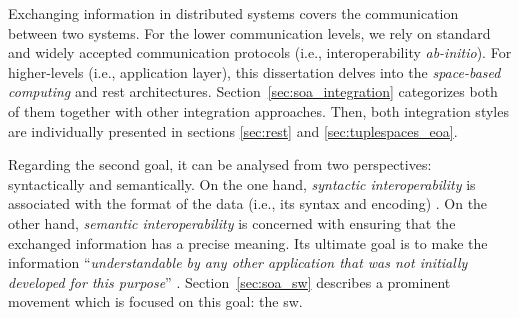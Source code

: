 \medskip

Exchanging information in distributed systems covers the communication between two systems.
For the lower communication levels, we rely on standard and widely accepted communication protocols (i.e., interoperability \emph{ab-initio}). %
For higher-levels (i.e., application layer), this dissertation delves into the \emph{space-based computing} and \ac{rest} architectures.
Section~\ref{sec:soa_integration} categorizes both of them together with other integration approaches.
Then, both integration styles are individually presented in sections \ref{sec:rest} and \ref{sec:tuplespaces_eoa}.

\medskip

Regarding the second goal, it can be analysed from two perspectives: syntactically and semantically.
On the one hand, \emph{syntactic interoperability} is associated with the format of the data (i.e., its syntax and encoding) \citep{van_der_veer_achieving_2006}. %
On the other hand, \emph{semantic interoperability} is concerned with ensuring that the exchanged information has a precise meaning.
Its ultimate goal is to make the information ``\emph{understandable by any other application that was not initially developed for this purpose}'' \citep{_european_2004}.
Section~\ref{sec:soa_sw} describes a prominent movement which is focused on this goal: the \acl{sw}. %









